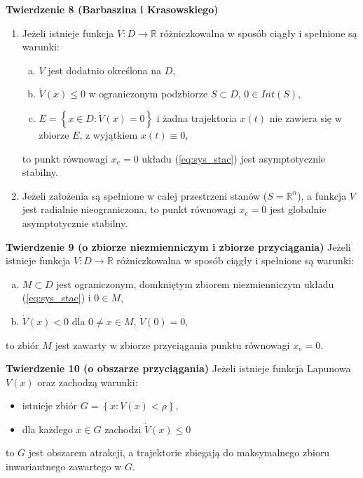 \documentclass{article}
\begin{document}
\textbf{Twierdzenie 8 (Barbaszina i Krasowskiego)}
\begin{enumerate}
    \item Jeżeli istnieje funkcja $V:D\rightarrow\mathbb{R}$ różniczkowalna w sposób ciągły i spełnione są warunki:
    \begin{enumerate}[(a)]
        \item $V$ jest dodatnio określona na $D$,
        \item $\dot{V}(x) \leq 0$ w ograniczonym podzbiorze $S \subset D$, $0 \in Int(S)$,
        \item $E = \left\{ x \in D: \dot{V}(x)=0 \right\}$ i żadna trajektoria $x(t)$ nie zawiera się w zbiorze $E$, z wyjątkiem $x(t) \equiv 0$,
    \end{enumerate}
    to punkt równowagi $x_{e} = 0$ układu (\ref{eq:sys_stac}) jest asymptotycznie stabilny.

    \item Jeżeli założenia są spełnione w całej przestrzeni stanów ($S = \mathbb{R}^{n}$), a funkcja $V$ jest radialnie nieograniczona, to punkt równowagi $x_{e} = 0$ jest globalnie asymptotycznie stabilny.
\end{enumerate}

\textbf{Twierdzenie 9 (o zbiorze niezmienniczym i zbiorze przyciągania)}
Jeżeli istnieje funkcja $V:D\rightarrow\mathbb{R}$ różniczkowalna w sposób ciągły i spełnione są warunki:
\begin{enumerate}[(a)]
    \item $M \subset D$ jest ograniczonym, domkniętym zbiorem niezmienniczym układu (\ref{eq:sys_stac}) i $0 \in M$,
    \item $\dot{V}(x) < 0$ dla $0 \neq x \in M$, $\dot{V}(0) = 0$,
\end{enumerate}
to zbiór $M$ jest zawarty w zbiorze przyciągania punktu równowagi $x_{e} = 0$.

\textbf{Twierdzenie 10 (o obszarze przyciągania)}
Jeżeli istnieje funkcja Lapunowa $V(x)$ oraz zachodzą warunki:
\begin{itemize}[(a)]
    \item istnieje zbiór $G = \left\{x:  V(x) < \rho \right\}$,
    \item dla każdego $x \in G$ zachodzi $\dot{V}(x) \leq 0$
\end{itemize}
to $G$ jest obszarem atrakcji, a trajektorie zbiegają do maksymalnego zbioru inwariantnego zawartego w $G$.
\end{document}
